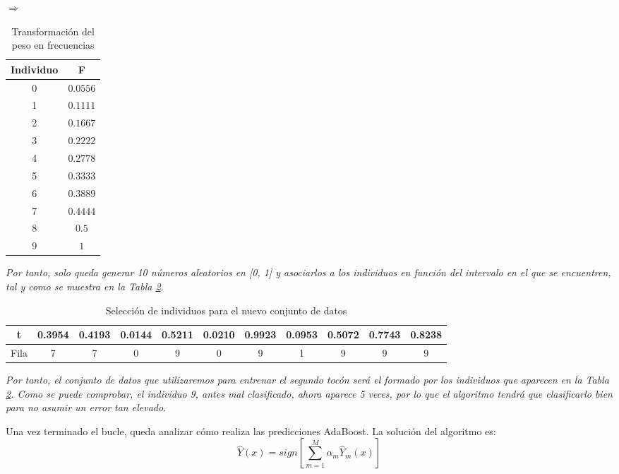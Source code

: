 \documentclass[12pt,twoside]{article}
\begin{document}
\begin{table}[H]
\centering
$\Rightarrow$
\begin{tabular}{|c|c|}
\hline
Individuo & F \\ \hline
0 & $0.0556$ \\ \hline
1 & $0.1111$ \\ \hline
2 & $0.1667$ \\ \hline
3 & $0.2222$ \\ \hline
4 & $0.2778$ \\ \hline
5 & $0.3333$ \\ \hline
6 & $0.3889$ \\ \hline
7 & $0.4444$ \\ \hline
8 & $0.5$ \\ \hline
9 & $1$ \\ \hline
\end{tabular}
\caption{Transformación del peso en frecuencias}
\label{tab:AdaB_pesos_ex}
\end{table}

\textit{Por tanto, solo queda generar 10 números aleatorios en [0, 1] y asociarlos a los individuos en función del intervalo en el que se encuentren, tal y como se muestra en la Tabla \ref{tab:AdaB_selec}.}
\begin{table}[H]
\centering
\begin{tabular}{|c|c|c|c|c|c|c|c|c|c|c|}
\hline
t & 0.3954 & 0.4193 & 0.0144 & 0.5211 & 0.0210 & 0.9923 & 0.0953 & 0.5072 & 0.7743 & 0.8238 \\ \hline
Fila & 7 & 7 & 0 & 9 & 0 & 9 & 1 & 9 & 9 & 9 \\ \hline
\end{tabular}
\caption{Selección de individuos para el nuevo conjunto de datos}
\label{tab:AdaB_selec}
\end{table}

\textit{Por tanto, el conjunto de datos que utilizaremos para entrenar el segundo tocón será el formado por los individuos que aparecen en la Tabla \ref{tab:AdaB_selec}. Como se puede comprobar, el individuo 9, antes mal clasificado, ahora aparece 5 veces, por lo que el algoritmo tendrá que clasificarlo bien para no asumir un error tan elevado.}

\bigskip \bigskip


Una vez terminado el bucle, queda analizar cómo realiza las predicciones AdaBoost. La solución del algoritmo es:
\begin{equation*}
\hat{Y}(x) = sign \left[ \sum_{m=1}^M \alpha_m \hat{Y}_m(x) \right]
\end{equation*}
\end{document}

